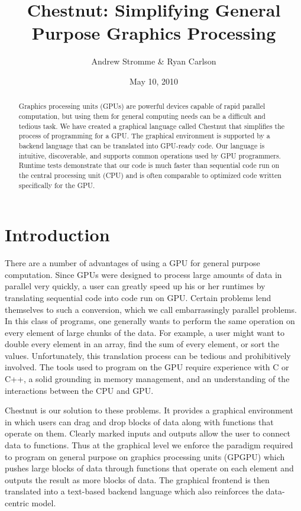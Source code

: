 \documentclass[twocolumn]{article}
\renewcommand{\|}{\origbar} %
\begin{document}
\title{Chestnut: Simplifying General Purpose Graphics Processing}
\author{Andrew Stromme \& Ryan Carlson}
\date{May 10, 2010}
\maketitle

\begin{abstract}
  Graphics processing units (GPUs) are powerful devices capable of rapid parallel computation, but using them for general computing needs can be a difficult and tedious task. We have created a graphical language called Chestnut that simplifies the process of programming for a GPU. The graphical environment is supported by a backend language that can be translated into GPU-ready code. Our language is intuitive, discoverable, and supports common operations used by GPU programmers. Runtime tests demonstrate that our code is much faster than sequential code run on the central processing unit (CPU) and is often comparable to optimized code written specifically for the GPU.
\end{abstract}

\section{Introduction}


There are a number of advantages of using a GPU for general purpose computation. Since GPUs were designed to process large amounts of data in parallel very quickly, a user can greatly speed up his or her runtimes by translating sequential code into code run on GPU. Certain problems lend themselves to such a conversion, which we call embarrassingly parallel problems. In this class of programs, one generally wants to perform the same operation on every element of large chunks of the data. For example, a user might want to double every element in an array, find the sum of every element, or sort the values. Unfortunately, this translation process can be tedious and prohibitively involved. The tools used to program on the GPU require experience with C or C++, a solid grounding in memory management, and an understanding of the interactions between the CPU and GPU. 

Chestnut is our solution to these problems. It provides a graphical environment in which users can drag and drop blocks of data along with functions that operate on them. Clearly marked inputs and outputs allow the user to connect data to functions. Thus at the graphical level we enforce the paradigm required to program on general purpose on graphics processing units (GPGPU) which pushes large blocks of data through functions that operate on each element and outputs the result as more blocks of data. The graphical frontend is then translated into a text-based backend language which also reinforces the data-centric model.
\end{document}
